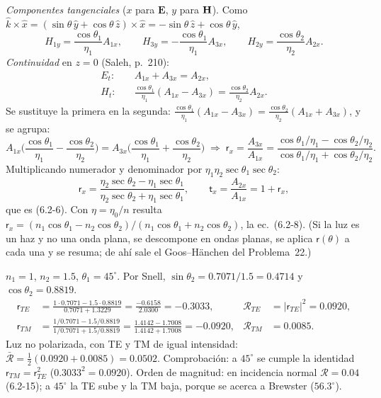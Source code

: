 \emph{Componentes tangenciales} ($x$ para $\mathbf E$, $y$ para $\mathbf H$). Como
$\hat k\times\hat x=(\sin\theta\,\hat y+\cos\theta\,\hat z)\times\hat x=-\sin\theta\,\hat z+\cos\theta\,\hat y$,
\[
H_{1y}=\frac{\cos\theta_1}{\eta_1}A_{1x},\qquad H_{3y}=-\frac{\cos\theta_1}{\eta_1}A_{3x},\qquad
H_{2y}=\frac{\cos\theta_2}{\eta_2}A_{2x}.
\]
\emph{Continuidad} en $z=0$ (Saleh, p.~210):
\begin{align*}
E_t:&\quad A_{1x}+A_{3x}=A_{2x},\\
H_t:&\quad \frac{\cos\theta_1}{\eta_1}(A_{1x}-A_{3x})=\frac{\cos\theta_2}{\eta_2}A_{2x}.
\end{align*}
Se sustituye la primera en la segunda:
$\frac{\cos\theta_1}{\eta_1}(A_{1x}-A_{3x})=\frac{\cos\theta_2}{\eta_2}(A_{1x}+A_{3x})$, y se agrupa:
\[
A_{1x}\Big(\frac{\cos\theta_1}{\eta_1}-\frac{\cos\theta_2}{\eta_2}\Big)=A_{3x}\Big(\frac{\cos\theta_1}{\eta_1}+\frac{\cos\theta_2}{\eta_2}\Big)
\;\Rightarrow\;
\mathsf r_x=\frac{A_{3x}}{A_{1x}}=\frac{\cos\theta_1/\eta_1-\cos\theta_2/\eta_2}{\cos\theta_1/\eta_1+\cos\theta_2/\eta_2}.
\]
Multiplicando numerador y denominador por $\eta_1\eta_2\sec\theta_1\sec\theta_2$:
\[
\boxed{\mathsf r_x=\frac{\eta_2\sec\theta_2-\eta_1\sec\theta_1}{\eta_2\sec\theta_2+\eta_1\sec\theta_1}},\qquad
\mathsf t_x=\frac{A_{2x}}{A_{1x}}=1+\mathsf r_x ,
\]
que es (6.2-6). Con $\eta=\eta_0/n$ resulta
$\mathsf r_x=(n_1\cos\theta_1-n_2\cos\theta_2)/(n_1\cos\theta_1+n_2\cos\theta_2)$, la ec.~(6.2-8).
(Si la luz es un haz y no una onda plana, se descompone en ondas planas, se aplica $\mathsf r(\theta)$ a cada una
y se resuma; de ahí sale el Goos--Hänchen del Problema~22.)

 $n_1=1$, $n_2=1.5$, $\theta_1=45^\circ$. Por Snell, $\sin\theta_2=0.7071/1.5=0.4714$ y
$\cos\theta_2=0.8819$.
\begin{align*}
\mathsf r_{TE}&=\frac{1\cdot0.7071-1.5\cdot0.8819}{0.7071+1.3229}=\frac{-0.6158}{2.0300}=-0.3033,
&\mathcal R_{TE}&=|\mathsf r_{TE}|^2=0.0920,\\
\mathsf r_{TM}&=\frac{1/0.7071-1.5/0.8819}{1/0.7071+1.5/0.8819}=\frac{1.4142-1.7008}{1.4142+1.7008}=-0.0920,
&\mathcal R_{TM}&=0.0085 .
\end{align*}
Luz no polarizada, con TE y TM de igual intensidad: $\bar{\mathcal R}=\frac12(0.0920+0.0085)=0.0502$.
Comprobación: a $45^\circ$ se cumple la identidad $\mathsf r_{TM}=\mathsf r_{TE}^2$ ($0.3033^2=0.0920$).
Orden de magnitud: en incidencia normal $\mathcal R=0.04$ (6.2-15); a $45^\circ$ la TE sube y la TM baja,
porque se acerca a Brewster ($56.3^\circ$).

